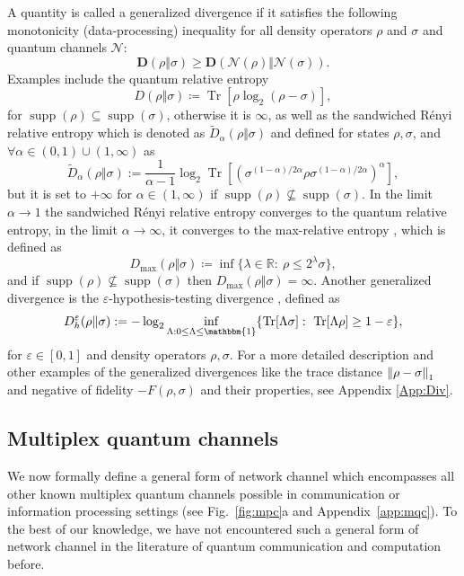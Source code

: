 \documentclass[aps,pra,twocolumn,superscriptaddress,longbibliography]{revtex4-1}
\def\Tr{\operatorname{Tr}}
\def\supp{\operatorname{supp}}
\def\({\left(}
\def\){\right)}
\newcommand{\mc}[1]{\mathcal{#1}}
\newcommand{\wt}[1]{\widetilde{#1}}
\newcommand{\bbm}[1]{\mathbbm{#1}}
\begin{document}
A quantity is called a generalized divergence \cite{PV10,SW12} if it satisfies the following monotonicity (data-processing) inequality for all density operators $\rho$ and $\sigma$ and quantum channels $\mc{N}$:
\begin{equation}\label{eq:gen-div-mono}
\mathbf{D}(\rho\Vert \sigma)\geq \mathbf{D}(\mathcal{N}(\rho)\Vert \mc{N}(\sigma)).
\end{equation}
Examples include the quantum relative entropy~\cite{Ume62} 
\begin{equation}
D(\rho\Vert\sigma)\coloneqq \Tr[\rho\log_2(\rho-\sigma)],
\end{equation}
for $\supp(\rho)\subseteq \supp(\sigma)$, otherwise it is $\infty$, as well as the sandwiched R\'enyi relative entropy  \cite{MDSFT13,WWY14} which is denoted as $\wt{D}_\alpha(\rho\Vert\sigma)$  and defined for states
$\rho,\sigma$, and  $\forall \alpha\in (0,1)\cup(1,\infty)$ as
\begin{equation}\label{eq:def_sre}
\wt{D}_\alpha(\rho\Vert \sigma):= \frac{1}{\alpha-1}\log_2 \Tr\left[\left(\sigma^{ (1-\alpha) / 2\alpha }\rho\sigma^{ (1-\alpha) / 2\alpha }\right)^\alpha \right] ,
\end{equation}
but it is set to $+\infty$ for $\alpha\in(1,\infty)$ if $\supp(\rho)\nsubseteq \supp(\sigma)$. In the limit $\alpha\to 1$ the sandwiched R\'enyi relative entropy converges to the quantum relative entropy, in the limit  $\alpha\to \infty$, it converges to the max-relative entropy \cite{MDSFT13}, which is defined as \cite{D09,Dat09}
\begin{equation}\label{eq:max-rel}
D_{\max}(\rho\Vert\sigma)\coloneqq \inf\{\lambda\in\mathbb{R}:\ \rho \leq 2^\lambda\sigma\},
\end{equation}
and if $\supp(\rho)\nsubseteq\supp(\sigma)$ then $D_{\max}(\rho\Vert\sigma)=\infty$. Another generalized divergence  is the $\varepsilon$-hypothesis-testing divergence \cite{BD10,WR12},  defined as
\begin{equation}
D^\varepsilon_h\!\(\rho\Vert\sigma\):=-\log_2\inf_{\Lambda: 0\leq\Lambda\leq \bbm{1}}\{\Tr[\Lambda\sigma]:\  \Tr[\Lambda\rho]\geq 1-\varepsilon\},
\end{equation}
for $\varepsilon\in[0,1]$ and density operators $\rho,\sigma$. For a more detailed description and other examples of the generalized divergences like the trace distance $\norm{\rho-\sigma}_{1}$ and negative of fidelity $-F(\rho,\sigma)$ and their properties, see Appendix \ref{App:Div}. 


\subsection{Multiplex quantum channels}\label{sec:mc}
We now formally define a general form of network channel which encompasses all other known multiplex quantum channels possible in communication or information processing settings (see Fig.~\ref{fig:mpc}a and Appendix~\ref{app:mqc}). To the best of our knowledge, we have not encountered such a general form of network channel in the literature of quantum communication and computation before. 
\end{document}
